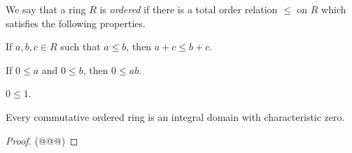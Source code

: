 \begin{dfn}
We say that a ring \(R\) is \emph{ordered} if there is a total order relation \(\leq\) on \(R\) which satisfies the following properties.
\begin{proplist}
\item If \(a,b,c \in R\) such that \(a \leq b\), then \(a+c \leq b+c\).
\item If \(0 \leq a\) and \(0 \leq b\), then \(0 \leq ab\).
\item \(0 \leq 1\).
\end{proplist}
\end{dfn}

\begin{prop}
Every commutative ordered ring is an integral domain with characteristic zero.
\end{prop}

\begin{proof}
(@@@)
\end{proof}
